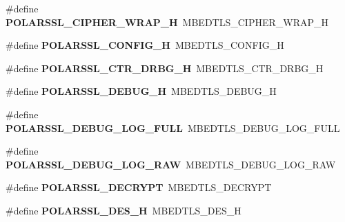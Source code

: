 \begin{DoxyCompactItemize}
\item 
\mbox{\label{compat-1_83_8h_a1e0fbea31404a7e8bb06f4c07aa1c3c6}} 
\#define {\bfseries P\+O\+L\+A\+R\+S\+S\+L\+\_\+\+C\+I\+P\+H\+E\+R\+\_\+\+W\+R\+A\+P\+\_\+H}~M\+B\+E\+D\+T\+L\+S\+\_\+\+C\+I\+P\+H\+E\+R\+\_\+\+W\+R\+A\+P\+\_\+H
\item 
\mbox{\label{compat-1_83_8h_a9d9767c04599826f9dae8bab50dce333}} 
\#define {\bfseries P\+O\+L\+A\+R\+S\+S\+L\+\_\+\+C\+O\+N\+F\+I\+G\+\_\+H}~M\+B\+E\+D\+T\+L\+S\+\_\+\+C\+O\+N\+F\+I\+G\+\_\+H
\item 
\mbox{\label{compat-1_83_8h_a34c44b95102db90eb5e5e81f63692e0a}} 
\#define {\bfseries P\+O\+L\+A\+R\+S\+S\+L\+\_\+\+C\+T\+R\+\_\+\+D\+R\+B\+G\+\_\+H}~M\+B\+E\+D\+T\+L\+S\+\_\+\+C\+T\+R\+\_\+\+D\+R\+B\+G\+\_\+H
\item 
\mbox{\label{compat-1_83_8h_a25506952a265c23e7c0675498d3f464f}} 
\#define {\bfseries P\+O\+L\+A\+R\+S\+S\+L\+\_\+\+D\+E\+B\+U\+G\+\_\+H}~M\+B\+E\+D\+T\+L\+S\+\_\+\+D\+E\+B\+U\+G\+\_\+H
\item 
\mbox{\label{compat-1_83_8h_a22b4e84bee2331a8619361e89e88f32d}} 
\#define {\bfseries P\+O\+L\+A\+R\+S\+S\+L\+\_\+\+D\+E\+B\+U\+G\+\_\+\+L\+O\+G\+\_\+\+F\+U\+LL}~M\+B\+E\+D\+T\+L\+S\+\_\+\+D\+E\+B\+U\+G\+\_\+\+L\+O\+G\+\_\+\+F\+U\+LL
\item 
\mbox{\label{compat-1_83_8h_af79a062d27a8387a9b1cd98e72f9d35e}} 
\#define {\bfseries P\+O\+L\+A\+R\+S\+S\+L\+\_\+\+D\+E\+B\+U\+G\+\_\+\+L\+O\+G\+\_\+\+R\+AW}~M\+B\+E\+D\+T\+L\+S\+\_\+\+D\+E\+B\+U\+G\+\_\+\+L\+O\+G\+\_\+\+R\+AW
\item 
\mbox{\label{compat-1_83_8h_a534f1e964e942820da090be4dc9bdb79}} 
\#define {\bfseries P\+O\+L\+A\+R\+S\+S\+L\+\_\+\+D\+E\+C\+R\+Y\+PT}~M\+B\+E\+D\+T\+L\+S\+\_\+\+D\+E\+C\+R\+Y\+PT
\item 
\mbox{\label{compat-1_83_8h_a4814f3a1e70b852a32b9a06e50cfcdea}} 
\#define {\bfseries P\+O\+L\+A\+R\+S\+S\+L\+\_\+\+D\+E\+S\+\_\+H}~M\+B\+E\+D\+T\+L\+S\+\_\+\+D\+E\+S\+\_\+H
\item 
\mbox{\label{compat-1_83_8h_a1a6e69ad223978b2f5e959bfc8ecca55}} 

\end{DoxyCompactItemize}
